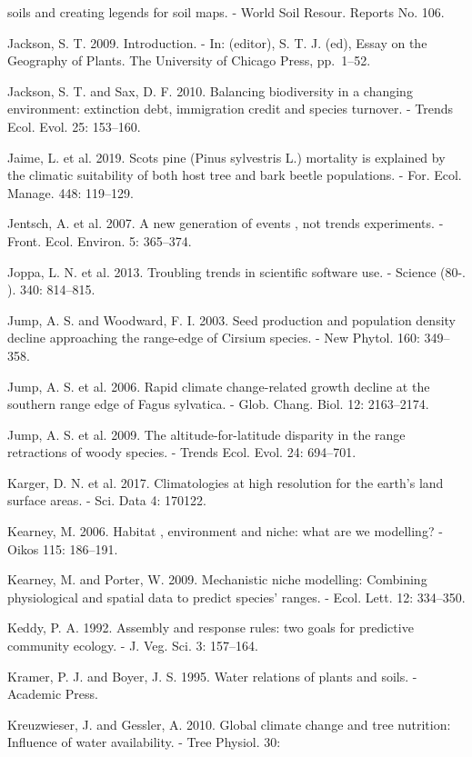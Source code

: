 \documentclass[11pt,twoside]{reedthesis}
\begin{document}
soils and creating legends for soil maps. - World Soil Resour. Reports
No. 106.\par
Jackson, S. T. 2009. Introduction. - In: (editor), S. T. J. (ed), Essay
on the Geography of Plants. The University of Chicago Press,
pp.~1--52.\par
Jackson, S. T. and Sax, D. F. 2010. Balancing biodiversity in a changing
environment: extinction debt, immigration credit and species turnover. -
Trends Ecol. Evol. 25: 153--160.\par
Jaime, L. et al. 2019. Scots pine (Pinus sylvestris L.) mortality is
explained by the climatic suitability of both host tree and bark beetle
populations. - For. Ecol. Manage. 448: 119--129.\par
Jentsch, A. et al. 2007. A new generation of events , not trends
experiments. - Front. Ecol. Environ. 5: 365--374.\par
Joppa, L. N. et al. 2013. Troubling trends in scientific software use. -
Science (80-. ). 340: 814--815.\par
Jump, A. S. and Woodward, F. I. 2003. Seed production and population
density decline approaching the range-edge of Cirsium species. - New
Phytol. 160: 349--358.\par
Jump, A. S. et al. 2006. Rapid climate change-related growth decline at
the southern range edge of Fagus sylvatica. - Glob. Chang. Biol. 12:
2163--2174.\par
Jump, A. S. et al. 2009. The altitude-for-latitude disparity in the
range retractions of woody species. - Trends Ecol. Evol. 24:
694--701.\par
Karger, D. N. et al. 2017. Climatologies at high resolution for the
earth's land surface areas. - Sci. Data 4: 170122.\par
Kearney, M. 2006. Habitat , environment and niche: what are we
modelling? - Oikos 115: 186--191.\par
Kearney, M. and Porter, W. 2009. Mechanistic niche modelling: Combining
physiological and spatial data to predict species' ranges. - Ecol. Lett.
12: 334--350.\par
Keddy, P. A. 1992. Assembly and response rules: two goals for predictive
community ecology. - J. Veg. Sci. 3: 157--164.\par
Kramer, P. J. and Boyer, J. S. 1995. Water relations of plants and
soils. - Academic Press.\par
Kreuzwieser, J. and Gessler, A. 2010. Global climate change and tree
nutrition: Influence of water availability. - Tree Physiol. 30:
\end{document}
